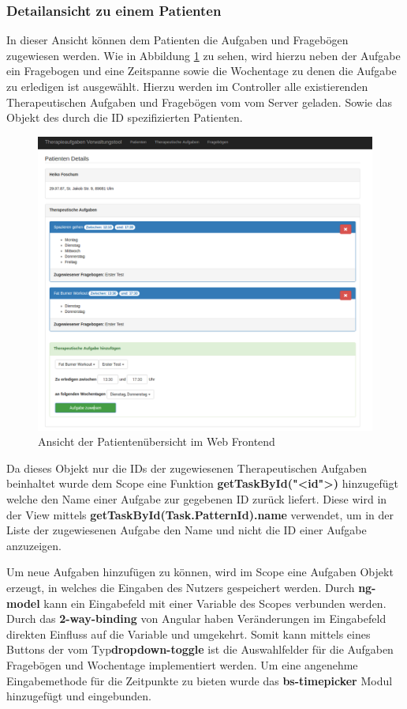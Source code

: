 \subsubsection{Detailansicht zu einem Patienten}
In dieser Ansicht können dem Patienten die Aufgaben und Fragebögen zugewiesen werden. Wie in Abbildung \ref{PatientDetailsAufgaben} zu sehen, wird hierzu neben der Aufgabe ein Fragebogen und eine Zeitspanne sowie die Wochentage zu denen die Aufgabe zu erledigen ist ausgewählt. Hierzu werden im Controller alle existierenden Therapeutischen Aufgaben und Fragebögen vom vom Server geladen. Sowie das Objekt des durch die ID spezifizierten Patienten.

\begin{figure}[H]
	\centering
	\includegraphics[scale=0.3]{images/Screenshots/PatientDetailsAufgaben}
	\caption[Ansicht der Patientenübersicht im Web Frontend]{Ansicht der Patientenübersicht im Web Frontend}
	\label{PatientDetailsAufgaben}
\end{figure}

Da dieses Objekt nur die IDs der zugewiesenen Therapeutischen Aufgaben beinhaltet wurde dem Scope eine Funktion \textbf{getTaskById("<id">)} hinzugefügt welche den Name einer Aufgabe zur gegebenen ID zurück liefert. Diese wird in der View mittels \textbf{getTaskById(Task.PatternId).name} verwendet, um in der Liste der zugewiesenen Aufgabe den Name und nicht die ID einer Aufgabe anzuzeigen.

Um neue Aufgaben hinzufügen zu können, wird im Scope eine Aufgaben Objekt erzeugt, in welches die Eingaben des Nutzers gespeichert werden. Durch \textbf{ng-model} kann ein Eingabefeld mit einer Variable des Scopes verbunden werden. Durch das \textbf{2-way-binding} von Angular haben Veränderungen im Eingabefeld direkten Einfluss auf die Variable und umgekehrt. Somit kann mittels eines Buttons der vom Typ\textbf{dropdown-toggle} ist die Auswahlfelder für die Aufgaben Fragebögen und Wochentage implementiert werden.
Um eine angenehme Eingabemethode für die Zeitpunkte zu bieten wurde das \textbf{bs-timepicker} Modul hinzugefügt und eingebunden.

